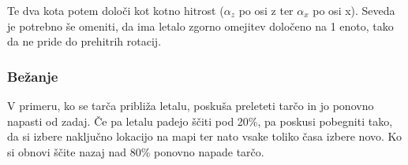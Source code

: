 \documentclass[a4paper]{article}
\begin{document}
Te dva kota potem določi kot kotno hitrost ($\alpha_z$ po osi z ter $\alpha_x$ po osi x). Seveda je potrebno še omeniti, da ima letalo zgorno omejitev določeno na 1 enoto, tako da ne pride do prehitrih rotacij.

\subsubsection{Bežanje}
V primeru, ko se tarča približa letalu, poskuša preleteti tarčo in jo ponovno napasti od zadaj. Če pa letalu padejo ščiti pod 20\%, pa poskusi pobegniti tako, da si izbere naključno lokacijo na mapi ter nato vsake toliko časa izbere novo. Ko si obnovi ščite nazaj nad 80\% ponovno napade tarčo.
\end{document}
